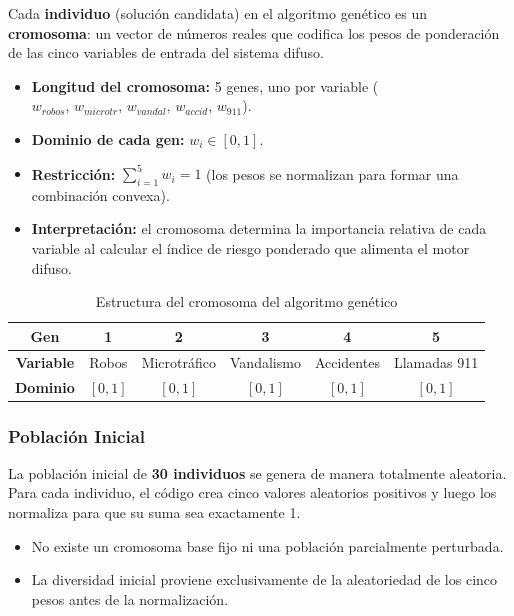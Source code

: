\documentclass[11pt]{article}
\begin{document}
Cada \textbf{individuo} (solución candidata) en el algoritmo genético es un \textbf{cromosoma}: un vector de números reales que codifica los pesos de ponderación de las cinco variables de entrada del sistema difuso.

\begin{itemize}
    \item \textbf{Longitud del cromosoma:} 5 genes, uno por variable ($w_{robos},\, w_{microtr},\, w_{vandal},\, w_{accid},\, w_{911}$).
    \item \textbf{Dominio de cada gen:} $w_i \in [0, 1]$.
    \item \textbf{Restricción:} $\sum_{i=1}^{5} w_i = 1$ (los pesos se normalizan para formar una combinación convexa).
    \item \textbf{Interpretación:} el cromosoma determina la importancia relativa de cada variable al calcular el índice de riesgo ponderado que alimenta el motor difuso.
\end{itemize}

\begin{table}[H]
    \centering
    \begin{tabular}{cccccc}
        \toprule
        \textbf{Gen} & 1 & 2 & 3 & 4 & 5 \\
        \midrule
        \textbf{Variable} & Robos & Microtráfico & Vandalismo & Accidentes & Llamadas 911 \\
        \textbf{Dominio}  & $[0,1]$ & $[0,1]$ & $[0,1]$ & $[0,1]$ & $[0,1]$ \\
        \bottomrule
    \end{tabular}
    \caption{Estructura del cromosoma del algoritmo genético}
    \par{}
\end{table}

\subsubsection{Población Inicial}

La población inicial de \textbf{30 individuos} se genera de manera totalmente aleatoria. Para cada individuo, el código crea cinco valores aleatorios positivos y luego los normaliza para que su suma sea exactamente 1.

\begin{itemize}
    \item No existe un cromosoma base fijo ni una población parcialmente perturbada.
    \item La diversidad inicial proviene exclusivamente de la aleatoriedad de los cinco pesos antes de la normalización.
\end{itemize}
\end{document}
